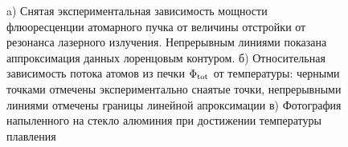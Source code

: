 \begin{figure}[ht]
    \centering
    \hspace{5 mm} 
    \vspace{-3mm}
    \caption{a) Снятая экспериментальная зависимость мощности флюоресценции атомарного пучка от величины отстройки от резонанса лазерного излучения. Непрерывным линиями показана аппроксимация данных лоренцовым контуром. б) Относительная зависимость потока атомов из печки $\Phi_{\textnormal{tot}}$ от температуры: черными точками отмечены экспериментально снаятые точки, непрерывными линиями отмечены границы линейной апроксимации  в) Фотография напыленного на стекло алюминия при достижении температуры плавления}
    \label{fig:oven}
\end{figure}


